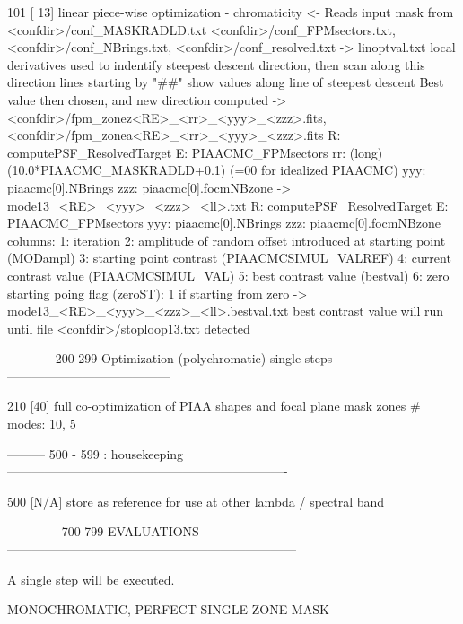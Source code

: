\begin{DoxyVerb}
101 [ 13]   linear piece-wise optimization - chromaticity
        <- Reads input mask from <confdir>/conf_MASKRADLD.txt <confdir>/conf_FPMsectors.txt, <confdir>/conf_NBrings.txt, <confdir>/conf_resolved.txt
        -> linoptval.txt
            local derivatives used to indentify steepest descent direction, then scan along this direction
            lines starting by "##" show values along line of steepest descent
            Best value then chosen, and new direction computed
        -> <confdir>/fpm_zonez<RE>_<rr>_<yyy>_<zzz>.fits,  <confdir>/fpm_zonea<RE>_<rr>_<yyy>_<zzz>.fits
            R:   computePSF_ResolvedTarget
            E:   PIAACMC_FPMsectors
            rr:  (long) (10.0*PIAACMC_MASKRADLD+0.1)    (=00 for idealized PIAACMC) 
            yyy: piaacmc[0].NBrings
            zzz: piaacmc[0].focmNBzone          
        -> mode13_<RE>_<yyy>_<zzz>_<ll>.txt
            R:   computePSF_ResolvedTarget
            E:   PIAACMC_FPMsectors         
            yyy: piaacmc[0].NBrings
            zzz: piaacmc[0].focmNBzone
        columns:
            1: iteration
            2: amplitude of random offset introduced at starting point (MODampl)
            3: starting point contrast (PIAACMCSIMUL_VALREF)
            4: current contrast value (PIAACMCSIMUL_VAL)
            5: best contrast value (bestval)
            6: zero starting poing flag (zeroST): 1 if starting from zero
        -> mode13_<RE>_<yyy>_<zzz>_<ll>.bestval.txt
            best contrast value
    will run until file <confdir>/stoploop13.txt detected   





----------- 200-299  Optimization (polychromatic) single steps ---------------------------------------

210 [40]    full co-optimization of PIAA shapes and focal plane mask zones
        # modes: 10, 5





--------- 500 - 599 : housekeeping -------------------------------------------------------------------

500 [N/A]   store as reference for use at other lambda / spectral band






------------ 700-799 EVALUATIONS ---------------------------------------------------------------------

A single step will be executed.

MONOCHROMATIC, PERFECT SINGLE ZONE MASK


\end{DoxyVerb}
